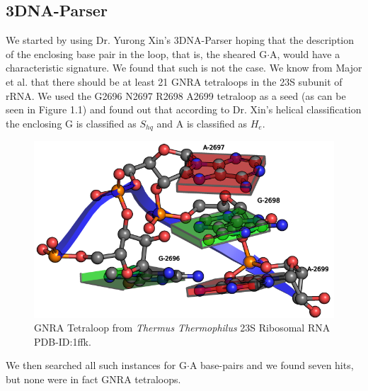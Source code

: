 \subsection{3DNA-Parser}
We started by using Dr. Yurong Xin's 3DNA-Parser hoping that the
description of the enclosing base pair in the loop, that is, the
sheared G$\cdot$A, would have a characteristic signature.
We found that such is not the case. We know from Major et
al. \cite{lemieux2006} that there should be at least 21 GNRA tetraloops
in the 23S subunit of rRNA. We used the G2696 N2697 R2698 A2699
tetraloop as a seed (as can be seen in Figure 1.1) and found out
that according to Dr. Xin's helical classification the enclosing G is
classified as $S_{hq}$ and A is classified as $H_{e}$. 
\begin{figure}[htbp]
\centering 
\includegraphics[angle=0, scale=0.5]{Chapter5/gnra.png}
\caption{GNRA Tetraloop from \textit{Thermus Thermophilus} 23S Ribosomal RNA PDB-ID:1ffk.}
\end{figure}
We then searched all such instances for G$\cdot$A base-pairs and we found seven hits,
but none were in fact GNRA tetraloops.

